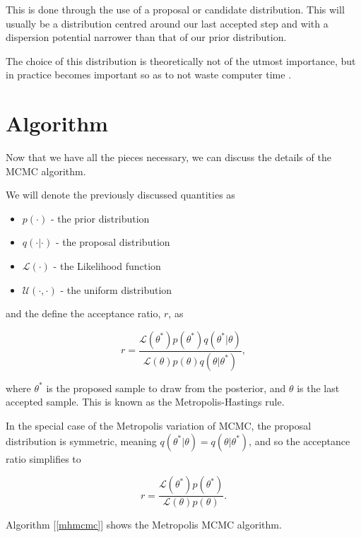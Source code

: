     This is done through the use of a proposal or candidate distribution. This will usually be a distribution centred around our last accepted step and with a dispersion potential narrower than that of our prior distribution.

    The choice of this distribution is theoretically not of the utmost importance, but in practice becomes important so as to not waste computer time \cite{Andrieu2003}.


\section{Algorithm}

    Now that we have all the pieces necessary, we can discuss the details of the MCMC algorithm.

    We will denote the previously discussed quantities as

    \begin{itemize}
        \item $p(\cdot)$ - the prior distribution
        \item $q(\cdot|\cdot)$ - the proposal distribution
        \item $\mathcal{L}(\cdot)$ - the Likelihood function
        \item $\mathcal{U}(\cdot,\cdot)$ - the uniform distribution
    \end{itemize}

    and the define the acceptance ratio, $r$, as

    \begin{equation}
    	r = \frac{\mathcal{L}(\theta^*)p(\theta^*)q(\theta^*|\theta)}{\mathcal{L}(\theta)p(\theta)q(\theta|\theta^*)},
    \end{equation}

    where $\theta^*$ is the proposed sample to draw from the posterior, and $\theta$ is the last accepted sample. This is known as the Metropolis-Hastings rule.

    In the special case of the Metropolis variation of MCMC, the proposal distribution is symmetric, meaning $q(\theta^*|\theta) = q(\theta|\theta^*)$, and so the acceptance ratio simplifies to

    \begin{equation}
    	r = \frac{\mathcal{L}(\theta^*)p(\theta^*)}{\mathcal{L}(\theta)p(\theta)}.
    \end{equation}

    Algorithm [\ref{mhmcmc}] shows the Metropolis MCMC algorithm.
    
